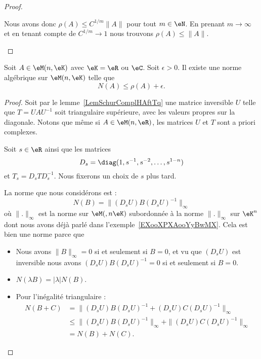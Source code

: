 \begin{proof}
\begin{subproof}
            Nous avons donc \( \rho(A)\leq C^{1/m}\| A \|\) pour tout \( m\in\eN\). En prenant \( m\to \infty\) et en tenant compte de \( C^{1/m}\to 1\) nous trouvons \( \rho(A)\leq \| A \|\).
    \end{subproof}
\end{proof}

\begin{lemma}        \label{LEMooGBLJooCPvxNl}
    Soit \( A\in \eM(n,\eK)\) avec \( \eK=\eR\) ou \( \eC\). Soit \( \epsilon>0\). Il existe une norme algébrique sur \( \eM(n,\eK)\) telle que
    \begin{equation}
        N(A)\leq \rho(A)+\epsilon.
    \end{equation}
\end{lemma}

\begin{proof}
    Soit par le lemme~\ref{LemSchurComplHAftTq} une matrice inversible \( U\) telle que \( T=UAU^{-1}\) soit triangulaire supérieure, avec les valeurs propres sur la diagonale. Notons que même si \( A\in \eM(n,\eR)\), les matrices \( U\) et \( T\) sont a priori complexes.

    Soit \( s\in \eR\) ainsi que les matrices
    \begin{equation}
        D_s=\diag(1,s^{-1},s^{-2},\ldots, s^{1-n})
    \end{equation}
    et \( T_s=D_sTD_s^{-1}\). Nous fixerons un choix de \( s\) plus tard.

    La norme que nous considérons est :
    \begin{equation}
        N(B)=\| (D_sU)B(D_sU)^{-1} \|_{\infty}
    \end{equation}
    où \( \| . \|_{\infty}\) est la norme sur \( \eM(,n\eK)\) subordonnée à la norme \( \| . \|_{\infty}\) sur \( \eK^n\) dont nous avons déjà parlé dans l'exemple~\ref{EXooXPXAooYyBwMX}. Cela est bien une norme parce que
    \begin{itemize}
        \item Nous avons \( \| B \|_{\infty}=0\) si et seulement si \( B=0\), et vu que \( (D_sU)\) est inversible nous avons \( (D_sU)B(D_sU)^{-1}=0\) si et seulement si \( B=0\).
        \item \( N(\lambda B)=| \lambda |N(B)\).
        \item Pour l'inégalité triangulaire :
            \begin{subequations}
                \begin{align}
             N(B+C)&=\| (D_sU)B(D_sU)^{-1}+(D_sU)C(D_sU)^{-1} \|_{\infty}\\
             &\leq  \| (D_sU)B(D_sU)^{-1}\|_{\infty} +\| (D_sU)C(D_sU)^{-1} \|_{\infty} \\
             &=N(B)+N(C).
                \end{align}
            \end{subequations}
    \end{itemize}


\end{proof}
